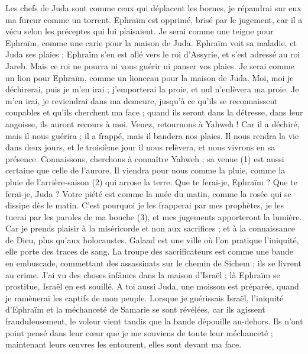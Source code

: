 \begin{multicols}{2}
Les chefs de Juda sont comme ceux qui déplacent les bornes, je répandrai sur eux ma fureur comme un torrent.
Ephraïm est opprimé, brisé par le jugement, car il a vécu selon les préceptes qui lui plaisaient.
Je serai comme une teigne pour Ephraïm, comme une carie pour la maison de Juda.
Ephraïm voit sa maladie, et Juda ses plaies ; Ephraïm s'en est allé vers le roi d'Assyrie, et s’est adressé au roi Jareb. Mais ce roi ne pourra ni vous guérir ni panser vos plaies.
Je serai comme un lion pour Ephraïm, comme un lionceau pour la maison de Juda. Moi, moi je déchirerai, puis je m'en irai ; j'emporterai la proie, et nul n’enlèvera ma proie.
Je m'en irai, je reviendrai dans ma demeure, jusqu'à ce qu'ils se reconnaissent coupables et qu'ils cherchent ma face ; quand ils seront dans la détresse, dans leur angoisse, ils auront recours à moi.
\VerseOne{}Venez, retournons à Yahweh ! Car il a déchiré, mais il nous guérira ; il a frappé, mais il bandera nos plaies.
Il nous rendra la vie dans deux jours, et le troisième jour il nous relèvera, et nous vivrons en sa présence.
Connaissons, cherchons à connaître Yahweh ; sa venue (1) est aussi certaine que celle de l’aurore. Il viendra pour nous comme la pluie, comme la pluie de l’arrière-saison (2) qui arrose la terre.
Que te ferai-je, Ephraïm ? Que te ferai-je, Juda ? Votre piété est comme la nuée du matin, comme la rosée qui se dissipe dès le matin.
C'est pourquoi je les frapperai par mes prophètes, je les tuerai par les paroles de ma bouche (3), et mes jugements apporteront la lumière.
Car je prends plaisir à la miséricorde et non aux sacrifices ; et à la connaissance de Dieu, plus qu’aux holocaustes.
Galaad est une ville où l’on pratique l’iniquité, elle porte des traces de sang.
La troupe des sacrificateurs est comme une bande en embuscade, commettant des assassinats sur le chemin de Sichem ; ils se livrent au crime.
J'ai vu des choses infâmes dans la maison d'Israël ; là Ephraïm se prostitue, Israël en est souillé.
A toi aussi Juda, une moisson est préparée, quand je ramènerai les captifs de mon peuple.
\VerseOne{}Lorsque je guérissais Israël, l'iniquité d'Ephraïm et la méchanceté de Samarie se sont révélées, car ils agissent frauduleusement, le voleur vient tandis que la bande dépouille au-dehors.
Ils n'ont point pensé dans leur cœur que je me souviens de toute leur méchanceté ; maintenant leurs œuvres les entourent, elles sont devant ma face.

\end{multicols}
